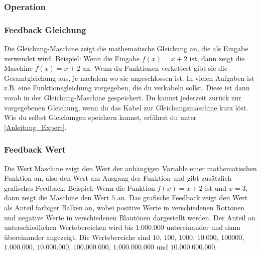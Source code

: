 \documentclass[12pt]{report}
\begin{document}
\subsubsection{Operation}

\subsubsection{Feedback Gleichung}
Die Gleichung-Maschine zeigt die mathematische Gleichung an, die als Eingabe verwendet wird. Beispiel: Wenn die Eingabe $f(x) = x + 2$ ist, dann zeigt die Maschine $f(x) = x + 2$ an. Wenn du Funktionen verkettest gibt sie die Gesamtgleichung aus, je nachdem wo sie angeschlossen ist. In vielen Aufgaben ist z.B. eine Funktionsgleichung vorgegeben, die du verkabeln sollst. Diese ist dann vorab in der Gleichung-Maschine gespeichert. Du kannst jederzeit zurück zur vorgegebenen Gleichung, wenn du das Kabel zur Gleichungsmaschine kurz löst. Wie du selbst Gleichungen speichern kannst, erfährst du unter \ref{Anleitung_Expert}.
\subsubsection{Feedback Wert}
Die Wert Maschine zeigt den Wert der anhängigen Variable einer mathematischen Funktion an, also den Wert am Ausgang der Funktion und gibt zusätzlich grafisches Feedback. 
Beispiel: Wenn die Funktion $f(x) = x + 2$ ist und $x = 3$, dann zeigt die Maschine den Wert $5$ an. 
Das grafische Feedback zeigt den Wert als Anteil farbiger Balken an, wobei positive Werte in verschiedenen Rottönen und negative Werte in verschiedenen Blautönen dargestellt werden. Der Anteil an unterschiedlichen Wertebereichen wird bis $1.000.000$ untereinander und dann übereinander angezeigt. Die Wertebereiche sind $10$, $100$, $1000$, $10.000$, $100000$, $1.000.000$, $10.000.000$, $100.000.000$, $1.000.000.000$ und $10.000.000.000$.
\end{document}
